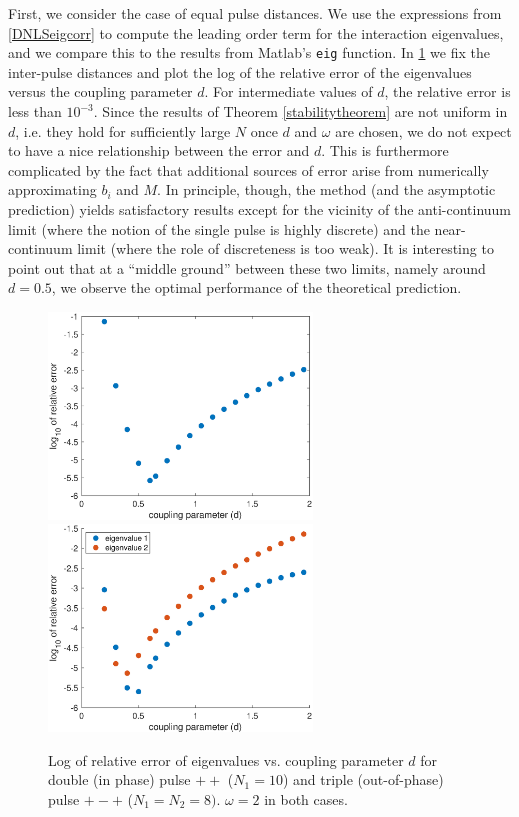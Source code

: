 \documentclass[12pt]{elsarticle}
\begin{document}
First, we consider the case of equal pulse distances. We use the expressions from \cref{DNLSeigcorr} to compute the leading order term for the interaction eigenvalues, and we compare this to the results from Matlab's \texttt{eig} function. In \cref{fig:error1} we fix the inter-pulse distances and plot the log of the relative error of the eigenvalues versus the coupling parameter $d$. For intermediate values of $d$, the relative error is less than $10^{-3}$. Since the results of Theorem \cref{stabilitytheorem} are not uniform in $d$, i.e. they hold for sufficiently large $N$ once $d$ and $\omega$ are chosen, we do not expect to have a nice relationship between the error and $d$. This is furthermore complicated by the fact that additional sources of error arise from  
numerically approximating $b_i$ and $M$. In principle, though, the method (and the asymptotic prediction) yields
satisfactory results except for the vicinity of the 
anti-continuum limit (where the notion of the single
pulse is highly discrete) and the near-continuum limit
(where the role of discreteness is too weak). 
It is interesting to point out that at a ``middle
ground'' between these two limits, namely around $d=0.5$,
we observe the optimal performance of the theoretical
prediction. 

\begin{figure}
\centering
\includegraphics[width=7cm]{errors1.eps}
\includegraphics[width=7cm]{errors2.eps}
\caption{Log of relative error of eigenvalues vs. coupling parameter $d$ for double (in phase) 
pulse $++$ ($N_1 = 10$) and triple (out-of-phase) pulse $+-+$ ($N_1 = N_2 = 8)$. $\omega = 2$ in both cases.}
\label{fig:error1}
\end{figure}
\end{document}
